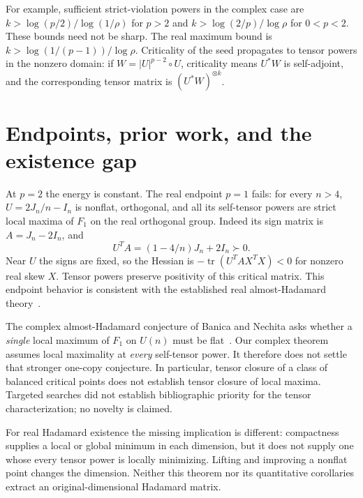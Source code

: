 For example, sufficient strict-violation powers in the complex case
are $k>\log(p/2)/\log(1/\rho)$ for $p>2$ and
$k>\log(2/p)/\log\rho$ for $0<p<2$. These bounds need not be sharp.
The real maximum bound is $k>\log(1/(p-1))/\log\rho$.
Criticality of the seed propagates to tensor powers in the nonzero
domain: if $W=|U|^{p-2}\circ U$, criticality means $U^*W$ is
self-adjoint, and the corresponding tensor matrix is $(U^*W)^{\otimes k}$.

\section{Endpoints, prior work, and the existence gap}
At $p=2$ the energy is constant. The real endpoint $p=1$ fails:
for every $n>4$, $U=2J_n/n-I_n$ is nonflat, orthogonal, and all its
self-tensor powers are strict local maxima of $F_1$ on the real
orthogonal group. Indeed its sign matrix is $A=J_n-2I_n$, and
\[
 U^TA=(1-4/n)J_n+2I_n\succ0.
\]
Near $U$ the signs are fixed, so the Hessian is
$-\operatorname{tr}(U^TA X^TX)<0$ for nonzero real skew $X$.
Tensor powers preserve positivity of this critical matrix.
This endpoint behavior is consistent with the established real
almost-Hadamard theory~\cite{BN,BNZ}.

The complex almost-Hadamard conjecture of Banica and Nechita asks
whether a \emph{single} local maximum of $F_1$ on $U(n)$ must be
flat~\cite{Complex}. Our complex theorem assumes local maximality at
\emph{every} self-tensor power. It therefore does not settle that
stronger one-copy conjecture. In particular, tensor closure of a
class of balanced critical points does not establish tensor closure
of local maxima. Targeted searches did not establish bibliographic
priority for the tensor characterization; no novelty is claimed.

For real Hadamard existence the missing implication is different:
compactness supplies a local or global minimum in each dimension,
but it does not supply one whose every tensor power is locally
minimizing. Lifting and improving a nonflat point changes the
dimension. Neither this theorem nor its quantitative corollaries
extract an original-dimensional Hadamard matrix.
